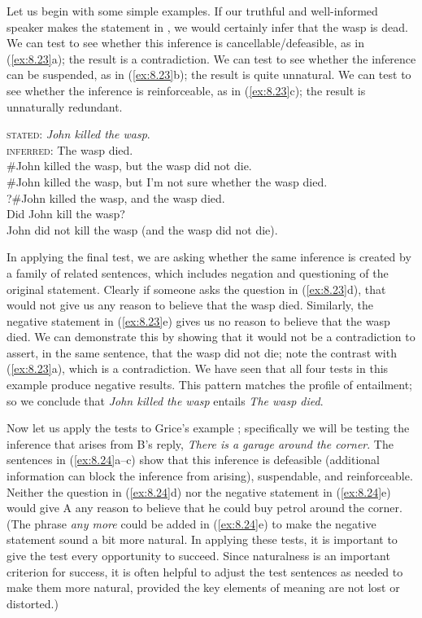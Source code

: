 Let us begin with some simple examples. If our truthful and well-informed speaker makes the statement in , we would certainly infer that the wasp is dead. We can test to see whether this inference is cancellable/defeasible, as in (\ref{ex:8.23}a); the result is a contradiction. We can test to see whether the inference can be suspended, as in (\ref{ex:8.23}b); the result is quite unnatural. We can test to see whether the inference is reinforceable, as in (\ref{ex:8.23}c); the result is unnaturally redundant.


\begin{stylepoints} \label{ex:8.23}
\textsc{stated}: \textit{John killed the wasp}.\\
\textsc{inferred}: The wasp died.\\
\ea \#John killed the wasp, but the wasp did not die.\\
\ex \#John killed the wasp, but I’m not sure whether the wasp died.\\
\ex ?\#John killed the wasp, and the wasp died.\\
\ex Did John kill the wasp?\\
\ex John did not kill the wasp (and the wasp did not die).
                       \z
\end{stylepoints}


In applying the final test, we are asking whether the same inference is created by a family of related sentences, which includes negation and questioning of the original statement. Clearly if someone asks the question in (\ref{ex:8.23}d), that would not give us any reason to believe that the wasp died. Similarly, the negative statement in (\ref{ex:8.23}e) gives us no reason to believe that the wasp died. We can demonstrate this by showing that it would not be a contradiction to assert, in the same sentence, that the wasp did not die; note the contrast with (\ref{ex:8.23}a), which is a contradiction. We have seen that all four tests in this example produce negative results. This pattern matches the profile of entailment; so we conclude that \textit{John killed the wasp} entails \textit{The wasp died}.



Now let us apply the tests to Grice’s example ; specifically we will be testing the inference that arises from B’s reply, \textit{There is a garage around the corner}. The sentences in (\ref{ex:8.24}a--c) show that this inference is defeasible (additional information can block the inference from arising), suspendable, and reinforceable. Neither the question in (\ref{ex:8.24}d) nor the negative statement in (\ref{ex:8.24}e) would give A any reason to believe that he could buy petrol around the corner. (The phrase \textit{any more} could be added in (\ref{ex:8.24}e) to make the negative statement sound a bit more natural. In applying these tests, it is important to give the test every opportunity to succeed. Since naturalness is an important criterion for success, it is often helpful to adjust the test sentences as needed to make them more natural, provided the key elements of meaning are not lost or distorted.)


